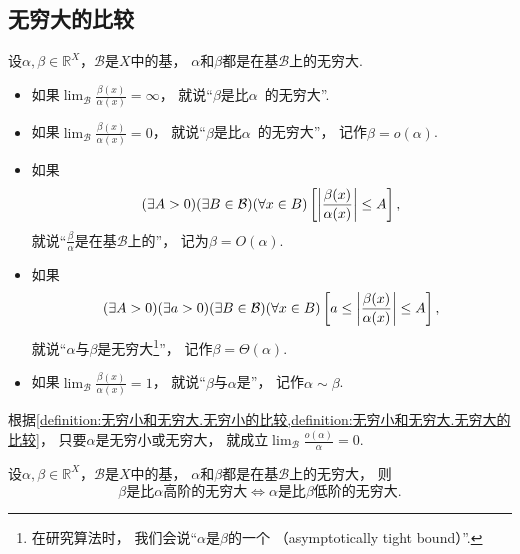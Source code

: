 \subsection{无穷大的比较}
\begin{definition}\label{definition:无穷小和无穷大.无穷大的比较}
设\(\alpha,\beta\in\mathbb{R}^X\)，\(\mathcal{B}\)是\(X\)中的基，
\(\alpha\)和\(\beta\)都是在基\(\mathcal{B}\)上的无穷大.
\newcommand{\lf}[1][]{\lim_\mathcal{B} \frac{\beta(x)}{\alpha^{#1}(x)}}
\begin{itemize}
	\item 如果\(\lf=\infty\)，
	就说“\(\beta\)是比\(\alpha\)~的无穷大”.

	\item 如果\(\lf=0\)，
	就说“\(\beta\)是比\(\alpha\)~的无穷大”，
	记作\(\beta = o(\alpha)\).

	\item 如果\[
		(\exists A>0)
		(\exists B\in\mathcal{B})
		(\forall x\in B)
		\left[
			\abs{\frac{\beta(x)}{\alpha(x)}} \leq A
		\right],
	\]
	就说“\(\frac\beta\alpha\)是在基\(\mathcal{B}\)上的”，
	记为\(\beta = O(\alpha)\).

	\item 如果\[
		(\exists A>0)
		(\exists a>0)
		(\exists B\in\mathcal{B})
		(\forall x\in B)
		\left[
			a \leq \abs{\frac{\beta(x)}{\alpha(x)}} \leq A
		\right],
	\]
	就说“\(\alpha\)与\(\beta\)是无穷大\footnote{在研究算法时，
	我们会说“\(\alpha\)是\(\beta\)的一个%
	（asymptotically tight bound）”.}”，
	记作\(\beta = \Theta(\alpha)\).

	\item 如果\(\lf=1\)，
	就说“\(\beta\)与\(\alpha\)是”，
	记作\(\alpha\sim\beta\).
\end{itemize}
\end{definition}
\begin{remark}
根据\cref{definition:无穷小和无穷大.无穷小的比较,definition:无穷小和无穷大.无穷大的比较}，
只要\(\alpha\)是无穷小或无穷大，
就成立\(\lim_\mathcal{B} \frac{o(\alpha)}{\alpha} = 0\).
\end{remark}

\begin{proposition}
设\(\alpha,\beta\in\mathbb{R}^X\)，\(\mathcal{B}\)是\(X\)中的基，
\(\alpha\)和\(\beta\)都是在基\(\mathcal{B}\)上的无穷大，
则\[
	\text{\(\beta\)是比\(\alpha\)高阶的无穷大}
	\iff
	\text{\(\alpha\)是比\(\beta\)低阶的无穷大}.
\]
\end{proposition}

